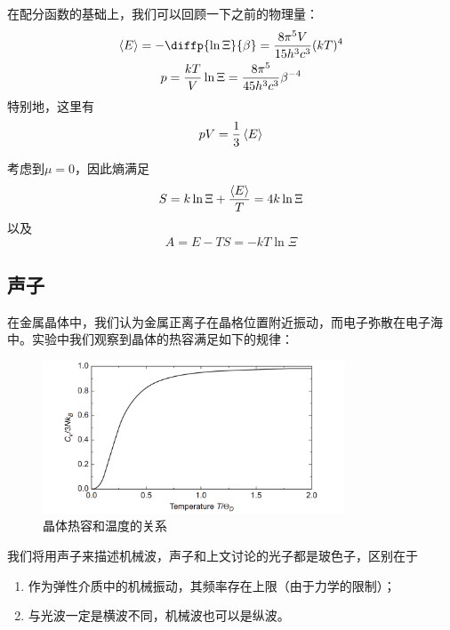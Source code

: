 在配分函数的基础上，我们可以回顾一下之前的物理量：\begin{gather}
    \braket{E} = -\diffp{{\ln \Xi}}{{\beta}} =\frac{8\pi^5 V}{15h^3 c^3}(kT)^4\\
    p=\frac{kT}{V} \ln \Xi =\frac{8\pi^5}{45h^3 c^3}\beta^{-4}
\end{gather}
特别地，这里有\begin{equation}
    pV =\frac{1}{3}\braket{E}
\end{equation}

考虑到$\mu=0$，因此熵满足\begin{equation}
    S=k\ln \Xi +\frac{\braket{E}}{T} =4k\ln\Xi
\end{equation}
以及\begin{equation}
    A=E-TS =-kT \ln \Xi
\end{equation}
\subsection{声子} %
\label{sub:声子}
在金属晶体中，我们认为金属正离子在晶格位置附近振动，而电子弥散在电子海中。实验中我们观察到晶体的热容满足如下的规律：
\begin{figure}[h]
       \centering
       \includegraphics[width=0.8\textwidth]{fig/specific heat.png}
       \caption{晶体热容和温度的关系 \protect\footnotemark }
       \label{fig:specific heat with T}
\end{figure}

我们将用声子来描述机械波，声子和上文讨论的光子都是玻色子，区别在于\begin{enumerate}
    \item 作为弹性介质中的机械振动，其频率存在上限（由于力学的限制）；
    \item 与光波一定是横波不同，机械波也可以是纵波。
\end{enumerate}

